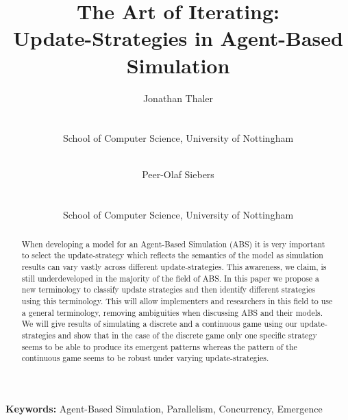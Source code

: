 \documentclass[a4paper, 10pt, conference]{IEEEconf}
\title{The Art of Iterating:\\Update-Strategies in Agent-Based Simulation}
\author{
	Jonathan Thaler \\
	\email{jonathan.thaler@nottingham.ac.uk} \\
	\begin{affiliation}
		School of Computer Science, University of Nottingham
	\end{affiliation} \\
	\and 
	Peer-Olaf Siebers \\
	\email{peer-olaf.siebers@nottingham.ac.uk} \\
	\begin{affiliation}
		School of Computer Science, University of Nottingham
	\end{affiliation} 
}
\begin{document}
\maketitle

\begin{abstract}
When developing a model for an Agent-Based Simulation (ABS) it is very important to select the update-strategy which reflects the semantics of the model as simulation results can vary vastly across different update-strategies. This awareness, we claim, is still underdeveloped in the majority of the field of ABS. In this paper we propose a new terminology to classify update strategies and then identify different strategies using this terminology. This will allow implementers and researchers in this field to use a general terminology, removing ambiguities when discussing ABS and their models. We will give results of simulating a discrete and a continuous game using our update-strategies and show that in the case of the discrete game only one specific strategy seems to be able to produce its emergent patterns whereas the pattern of the continuous game seems to be robust under varying update-strategies.
\end{abstract}

\textbf{Keywords:} Agent-Based Simulation, Parallelism, Concurrency, Emergence














%
%
\end{document}
